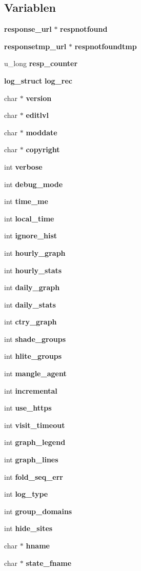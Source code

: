 \subsection*{Variablen}
\begin{CompactItemize}
\item 
{\bf response\_\-url} $\ast$ {\bf respnotfound}
\item 
{\bf responsetmp\_\-url} $\ast$ {\bf respnotfoundtmp}
\item 
u\_\-long {\bf resp\_\-counter}
\item 
{\bf log\_\-struct} {\bf log\_\-rec}
\item 
char $\ast$ {\bf version}
\item 
char $\ast$ {\bf editlvl}
\item 
char $\ast$ {\bf moddate}
\item 
char $\ast$ {\bf copyright}
\item 
int {\bf verbose}
\item 
int {\bf debug\_\-mode}
\item 
int {\bf time\_\-me}
\item 
int {\bf local\_\-time}
\item 
int {\bf ignore\_\-hist}
\item 
int {\bf hourly\_\-graph}
\item 
int {\bf hourly\_\-stats}
\item 
int {\bf daily\_\-graph}
\item 
int {\bf daily\_\-stats}
\item 
int {\bf ctry\_\-graph}
\item 
int {\bf shade\_\-groups}
\item 
int {\bf hlite\_\-groups}
\item 
int {\bf mangle\_\-agent}
\item 
int {\bf incremental}
\item 
int {\bf use\_\-https}
\item 
int {\bf visit\_\-timeout}
\item 
int {\bf graph\_\-legend}
\item 
int {\bf graph\_\-lines}
\item 
int {\bf fold\_\-seq\_\-err}
\item 
int {\bf log\_\-type}
\item 
int {\bf group\_\-domains}
\item 
int {\bf hide\_\-sites}
\item 
char $\ast$ {\bf hname}
\item 
char $\ast$ {\bf state\_\-fname}

\end{CompactItemize}

